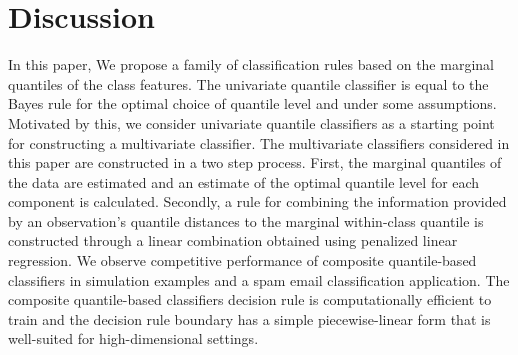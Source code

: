 
\section{Discussion}
\label{sec:discussion}

In this paper, We propose a family of classification rules based on the marginal
quantiles of the class features.  The univariate quantile classifier is equal to
the Bayes rule for the optimal choice of quantile level and under some
assumptions.  Motivated by this, we consider univariate quantile classifiers as
a starting point for constructing a multivariate classifier.  The multivariate
classifiers considered in this paper are constructed in a two step process.
First, the marginal quantiles of the data are estimated and an estimate of the
optimal quantile level for each component is calculated.  Secondly, a rule for
combining the information provided by an observation's quantile distances to the
marginal within-class quantile is constructed through a linear combination
obtained using penalized linear regression.  We observe competitive performance
of composite quantile-based classifiers in simulation examples and a spam email
classification application.  The composite quantile-based classifiers decision
rule is computationally efficient to train and the decision rule boundary has a
simple piecewise-linear form that is well-suited for high-dimensional settings.









